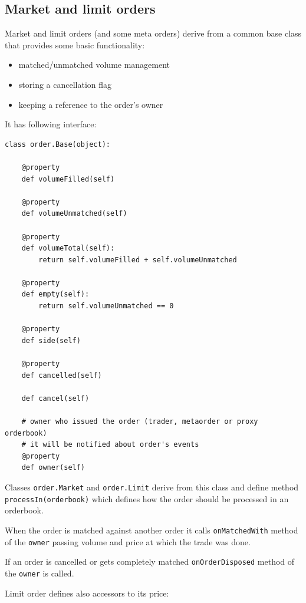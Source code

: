 \documentclass[a4paper,11pt]{article}
\begin{document}
\subsection{Market and limit orders}\label{market-and-limit-orders}

Market and limit orders (and some meta orders) derive from a common base
class that provides some basic functionality:

\begin{itemize}
\itemsep1pt\parskip0pt
\item
  matched/unmatched volume management
\item
  storing a cancellation flag
\item
  keeping a reference to the order's owner
\end{itemize}

It has following interface:

\begin{verbatim}
class order.Base(object):

    @property
    def volumeFilled(self)

    @property
    def volumeUnmatched(self)

    @property
    def volumeTotal(self):
        return self.volumeFilled + self.volumeUnmatched

    @property
    def empty(self):
        return self.volumeUnmatched == 0

    @property
    def side(self)

    @property
    def cancelled(self)

    def cancel(self)

    # owner who issued the order (trader, metaorder or proxy orderbook)
    # it will be notified about order's events
    @property
    def owner(self)
\end{verbatim}

Classes \texttt{order.Market} and \texttt{order.Limit} derive from this
class and define method \texttt{processIn(orderbook)} which defines how
the order should be processed in an orderbook.

When the order is matched against another order it calls
\texttt{onMatchedWith} method of the \texttt{owner} passing volume and
price at which the trade was done.

If an order is cancelled or gets completely matched
\texttt{onOrderDisposed} method of the \texttt{owner} is called.

Limit order defines also accessors to its price:
\end{document}

